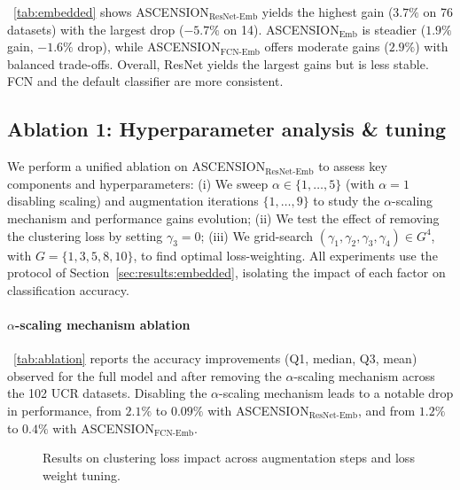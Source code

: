 \tablename~\ref{tab:embedded} shows
ASCENSION$_{\text{ResNet-Emb}}$ yields the highest gain ($3.7\%$
on 76 datasets) with the largest drop ($-5.7\%$ on 14).
ASCENSION$_{\text{Emb}}$ is steadier ($1.9\%$ gain, $-1.6\%$
drop), while ASCENSION$_{\text{FCN-Emb}}$ offers moderate gains
($2.9\%$) with balanced trade-offs. Overall, ResNet yields the
largest gains but is less stable. FCN and the default classifier are
more consistent.




\subsection{Ablation 1: Hyperparameter analysis \& tuning}
\label{sec:analysis:ablation}

We perform a unified ablation on
ASCENSION$_{\text{ResNet-Emb}}$ to assess key components and
hyperparameters:
(i) We sweep $\alpha \in \{1, \ldots, 5\}$ (with $\alpha = 1$
disabling scaling) and augmentation iterations
$\{1, \ldots, 9\}$ to study the $\alpha$-scaling mechanism and
performance gains evolution;
(ii) We test the effect of removing the clustering loss by
setting $\gamma_{3} = 0$;
(iii) We grid-search
$(\gamma_1, \gamma_2, \gamma_3, \gamma_4) \in G^{4}$, with
$G = \{1, 3, 5, 8, 10\}$, to find optimal loss-weighting. All
experiments use the protocol of
Section~\ref{sec:results:embedded}, isolating the impact of each
factor on classification accuracy.

\paragraph{$\alpha$-scaling mechanism ablation}
\tablename~\ref{tab:ablation} reports the accuracy improvements (Q1,
median, Q3, mean) observed for the full model and after removing the
$\alpha$-scaling mechanism across the 102 UCR datasets. Disabling
the $\alpha$-scaling mechanism leads to a notable drop in
performance, from $2.1\%$ to $0.09\%$ with
ASCENSION$_{\text{ResNet-Emb}}$, and from $1.2\%$ to $0.4\%$ with
ASCENSION$_{\text{FCN-Emb}}$.


\begin{figure}[!t]
\centering
{}\hfill
{}
\caption{Results on clustering loss impact across augmentation
steps and loss weight tuning.}
\label{fig:ablation-supp}
\end{figure}

